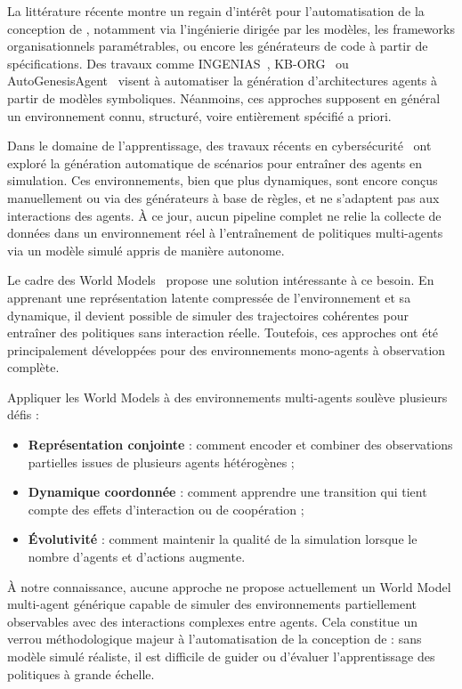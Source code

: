\medskip

\noindent
La littérature récente montre un regain d'intérêt pour l'automatisation de la conception de , notamment via l'ingénierie dirigée par les modèles, les frameworks organisationnels paramétrables, ou encore les générateurs de code à partir de spécifications. Des travaux comme INGENIAS~\cite{Pavon2003}, KB-ORG~\cite{Sims2008} ou AutoGenesisAgent~\cite{harper2024autogenesisagent} visent à automatiser la génération d'architectures agents à partir de modèles symboliques. Néanmoins, ces approches supposent en général un environnement connu, structuré, voire entièrement spécifié a priori.

\noindent
Dans le domaine de l'apprentissage, des travaux récents en cybersécurité~\cite{hammar2023scalable} ont exploré la génération automatique de scénarios pour entraîner des agents en simulation. Ces environnements, bien que plus dynamiques, sont encore conçus manuellement ou via des générateurs à base de règles, et ne s'adaptent pas aux interactions des agents. À ce jour, aucun pipeline complet ne relie la collecte de données dans un environnement réel à l'entraînement de politiques multi-agents via un modèle simulé appris de manière autonome.

\medskip

\noindent
Le cadre des World Models~\cite{Ha2018} propose une solution intéressante à ce besoin. En apprenant une représentation latente compressée de l'environnement et sa dynamique, il devient possible de simuler des trajectoires cohérentes pour entraîner des politiques sans interaction réelle. Toutefois, ces approches ont été principalement développées pour des environnements mono-agents à observation complète.

\noindent
Appliquer les World Models à des environnements multi-agents soulève plusieurs défis :
\begin{itemize}
    \item \textbf{Représentation conjointe} : comment encoder et combiner des observations partielles issues de plusieurs agents hétérogènes ;
    \item \textbf{Dynamique coordonnée} : comment apprendre une transition qui tient compte des effets d'interaction ou de coopération ;
    \item \textbf{Évolutivité} : comment maintenir la qualité de la simulation lorsque le nombre d'agents et d'actions augmente.
\end{itemize}

\noindent
À notre connaissance, aucune approche ne propose actuellement un World Model multi-agent générique capable de simuler des environnements partiellement observables avec des interactions complexes entre agents. Cela constitue un verrou méthodologique majeur à l'automatisation de la conception de  : sans modèle simulé réaliste, il est difficile de guider ou d'évaluer l'apprentissage des politiques à grande échelle.

